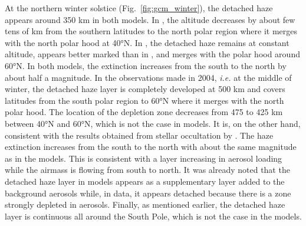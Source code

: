 At the northern winter solstice (Fig.~\ref{fig:gcm_winter}), the detached haze appears around 350 km
in both models. In \cite{Lebonnois2012}, the altitude decreases by about few tens of km from the southern latitudes to
the north polar region where it merges with the north polar hood at \ang{40}N. In \cite{Larson2015}, the detached
haze remains at constant altitude, appears better marked than in \cite{Lebonnois2012}, and merges with the polar hood
around \ang{60}N. In both models, the extinction increases from the south to the north by about half a magnitude.
In the observations made in 2004, \emph{i.e.} at the middle of winter, the detached haze layer is completely developed at
500 km and covers latitudes from the south polar region to \ang{60}N where it merges with the north polar hood. The
location of the depletion zone decreases from 475 to 425 km between \ang{40}N and \ang{60}N, which is not the case in
models. It is, on the other hand, consistent with the results obtained from stellar occultation by \cite{Sicardy2006}.
The haze extinction increases from the south to the north with about the same magnitude as in the models. This
is consistent with a layer increasing in aerosol loading while the airmass is flowing from south to north. It was already
noted \citep{West2011, West2018} that the detached haze layer in models appears as a supplementary layer added to
the background aerosols while, in data, it appears detached because there is a zone strongly depleted in
aerosols. Finally, as mentioned earlier, the detached haze layer is continuous all around the South Pole, which is not
the case in the models.

